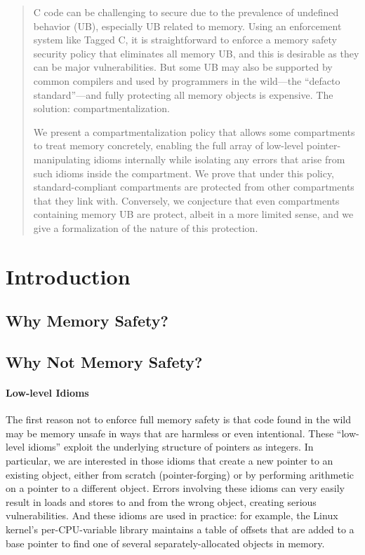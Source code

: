 \documentclass{article}
\begin{document}



\begin{abstract}

  C code can be challenging to secure due to the prevalence of undefined behavior (UB),
  especially UB related to memory. Using an enforcement system like Tagged C, it is
  straightforward to enforce a memory safety security policy that eliminates all memory
  UB, and this is desirable as they can be major vulnerabilities. But some UB may
  also be supported by common compilers and used by programmers in the wild---the
  ``defacto standard''---and fully protecting all memory objects is expensive.
  The solution: compartmentalization.

  We present a compartmentalization policy that allows some compartments to treat
  memory concretely, enabling the full array of low-level pointer-manipulating idioms
  internally while isolating any errors that arise from such idioms inside the compartment. 
  We prove that under this policy, standard-compliant compartments are protected from
  other compartments that they link with. Conversely, we conjecture that even compartments
  containing memory UB are protect, albeit in a more limited sense, and we
  give a formalization of the nature of this protection.
  
\end{abstract}

\section{Introduction}

\subsection{Why Memory Safety?}

\subsection{Why Not Memory Safety?}

\paragraph{Low-level Idioms}

The first reason not to enforce full memory safety is that code found in the wild may
be memory unsafe in ways that are harmless or even intentional. These ``low-level idioms''
exploit the underlying structure of pointers as integers. In particular, we are interested
in those idioms that create a new pointer to an existing object, either from scratch
(pointer-forging) or by performing arithmetic on a pointer to a different object. Errors
involving these idioms can very easily result in loads and stores to and from the wrong
object, creating serious vulnerabilities. And these idioms are used in practice: for example,
the Linux kernel's per-CPU-variable library maintains a table of offsets that are added to a
base pointer to find one of several separately-allocated objects in memory.
\end{document}
